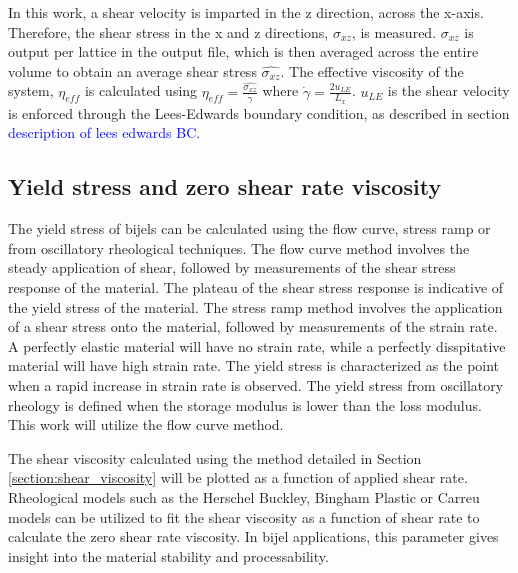 In this work, a shear velocity is imparted in the z direction, across the x-axis. Therefore, the shear stress in the x and z directions, $\sigma_{xz}$, is measured. $\sigma_{xz}$ is output per lattice in the output file, which is then averaged across the entire volume to obtain an average shear stress $\hat{\sigma_{xz}}$. The effective viscosity of the system, $\eta_{eff}$ is calculated using $\eta_{eff} = \frac{\hat{\sigma_{xz}}}{\dot{\gamma}}$ where $\dot{\gamma} = \frac{2 u_{LE}}{L_x}$. $u_{LE}$ is the shear velocity is enforced through the Lees-Edwards boundary condition, as described in section \textcolor{blue}{description of lees edwards BC}.

\subsection{Yield stress and zero shear rate viscosity}

The yield stress of bijels can be calculated using the flow curve, stress ramp or from oscillatory rheological techniques. The flow curve method involves the steady application of shear, followed by measurements of the shear stress response of the material. The plateau of the shear stress response is indicative of the yield stress of the material. The stress ramp method involves the application of a shear stress onto the material, followed by measurements of the strain rate. A perfectly elastic material will have no strain rate, while a perfectly disspitative material will have high strain rate. The yield stress is characterized as the point when a rapid increase in strain rate is observed. The yield stress from oscillatory rheology is defined when the storage modulus is lower than the loss modulus. This work will utilize the flow curve method.

The shear viscosity calculated using the method detailed in Section \ref{section:shear_viscosity} will be plotted as a function of applied shear rate. Rheological models such as the Herschel Buckley, Bingham Plastic or Carreu models can be utilized to fit the shear viscosity as a function of shear rate to calculate the zero shear rate viscosity. In bijel applications, this parameter gives insight into the material stability and processability.  